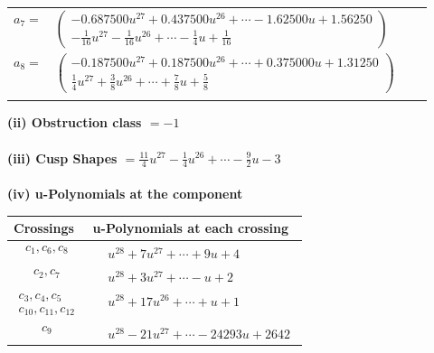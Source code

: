 \documentclass[1p]{elsarticle_modified}
\theoremstyle{definition}
\begin{document}
\begin{tabular}{m{7pt} m{180pt} m{7pt} m{180pt} }
\flushright $a_{7}=$&$\begin{pmatrix}-0.687500 u^{27}+0.437500 u^{26}+\cdots-1.62500 u+1.56250\\-\frac{1}{16} u^{27}-\frac{1}{16} u^{26}+\cdots-\frac{1}{4} u+\frac{1}{16}\end{pmatrix}$ \\
\flushright $a_{8}=$&$\begin{pmatrix}-0.187500 u^{27}+0.187500 u^{26}+\cdots+0.375000 u+1.31250\\\frac{1}{4} u^{27}+\frac{3}{8} u^{26}+\cdots+\frac{7}{8} u+\frac{5}{8}\end{pmatrix}$\\&\end{tabular}
\flushleft \textbf{(ii) Obstruction class $= -1$}\\~\\
\flushleft \textbf{(iii) Cusp Shapes $= \frac{11}{4} u^{27}-\frac{1}{4} u^{26}+\cdots-\frac{9}{2} u-3$}\\~\\
\newpage\renewcommand{\arraystretch}{1}
\flushleft \textbf{(iv) u-Polynomials at the component}\newline \\
\begin{tabular}{m{50pt}|m{274pt}}
Crossings & \hspace{64pt}u-Polynomials at each crossing \\
\hline $$\begin{aligned}c_{1},c_{6},c_{8}\end{aligned}$$&$\begin{aligned}
&u^{28}+7 u^{27}+\cdots+9 u+4
\end{aligned}$\\
\hline $$\begin{aligned}c_{2},c_{7}\end{aligned}$$&$\begin{aligned}
&u^{28}+3 u^{27}+\cdots- u+2
\end{aligned}$\\
\hline $$\begin{aligned}c_{3},c_{4},c_{5}\\c_{10},c_{11},c_{12}\end{aligned}$$&$\begin{aligned}
&u^{28}+17 u^{26}+\cdots+u+1
\end{aligned}$\\
\hline $$\begin{aligned}c_{9}\end{aligned}$$&$\begin{aligned}
&u^{28}-21 u^{27}+\cdots-24293 u+2642
\end{aligned}$\\
\hline
\end{tabular}\\~\\
\end{document}
